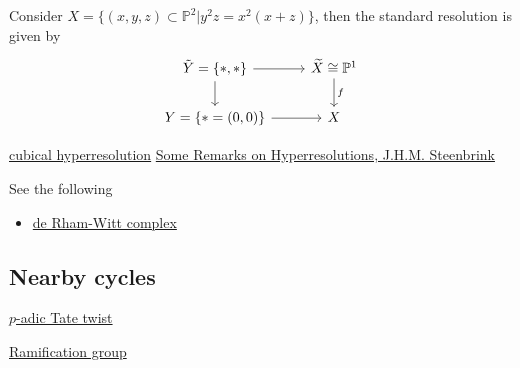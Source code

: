 \documentclass[../main.tex]{subfiles}
\begin{document}
\begin{example}
Consider $X=\{(x,y,z)\subset \mathbb{P}^{2}|y^{2}z=x^{2}(x+z)\}$, then the standard resolution is given by 
$$\begin{tikzcd}
\tilde{Y}=\{*, *\}\arrow{r}\arrow{d} & \widetilde{X}\cong \mathbb{P}^{1}\arrow{d}{f}\\
Y=\{*=(0,0)\}\arrow{r} & X\end{tikzcd}$$
\end{example}

\begin{remark}

\end{remark}

\begin{remark}

\end{remark}
\begin{remark}
\href{https://www.math.utah.edu/~schwede/Notes/NotesOnCubicalHyperresolutions.pdf}{cubical hyperresolution}
\href{https://link.springer.com/content/pdf/10.1007/978-3-319-28829-1_15.pdf}{Some Remarks on Hyperresolutions, J.H.M. Steenbrink}
\end{remark}

\begin{example}
\end{example}
\begin{example}
See the following 
\begin{itemize}
\item \href{https://www3.nd.edu/~mbehren1/TAGS/Davis_notes.pdf}{de Rham-Witt complex}
\end{itemize}
\end{example}

\subsection{Nearby cycles}
\begin{example}
\href{http://www.math.sci.hiroshima-u.ac.jp/algebra/agsympo/documents/Sato.pdf}{$p$-adic Tate twist}
\end{example}
\begin{example}
\href{https://en.wikipedia.org/wiki/Ramification_group}{Ramification group}
\end{example}
\end{document}
